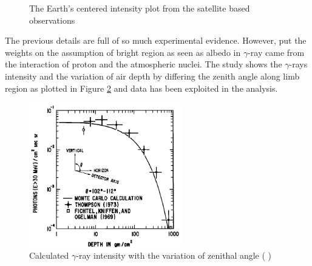 \begin{figure}[h!]
    \centering
        \hfill
        \caption{
            The Earth's centered intensity plot from the satellite based observations
        }
       \label{fig:gamma_earth_second_wave}
\end{figure}

The previous details are full of so much experimental evidence.
However, \cite{Morris84} put the weights on the assumption of 
bright region as seen as albedo in $\gamma$-ray came from the 
interaction of proton and the atmospheric nuclei. The study
shows the $\gamma$-rays intensity and the variation of air depth 
by differing the zenith angle along limb region as plotted in 
Figure \ref{fig:emit_photon_vs_depth} and \cite{Thompson81} data 
has been exploited in the analysis.

\begin{figure}[h!]
    \centering
    \includegraphics[width=0.6\textwidth]{content/literature_review/figures/morris_photon_vs_depth}
    \caption{
        Calculated $\gamma$-ray intensity with the variation of 
        zenithal angle
        (\cite{Morris84} )
    }
    \label{fig:emit_photon_vs_depth}
\end{figure}

